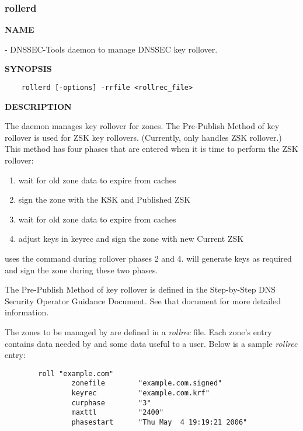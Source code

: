 \clearpage

\subsubsection{\bf rollerd}

{\bf NAME}

 - DNSSEC-Tools daemon to manage DNSSEC key rollover.

{\bf SYNOPSIS}

\begin{verbatim}
    rollerd [-options] -rrfile <rollrec_file>
\end{verbatim}

{\bf DESCRIPTION}

The  daemon manages key rollover for zones.  The Pre-Publish
Method of key rollover is used for ZSK key rollovers.  (Currently,
 only handles ZSK rollover.) This method has four phases that are
entered when it is time to perform the ZSK rollover:

\begin{enumerate}
\item wait for old zone data to expire from caches
\item sign the zone with the KSK and Published ZSK
\item wait for old zone data to expire from caches
\item adjust keys in keyrec and sign the zone with new Current ZSK
\end{enumerate}

 uses the  command during rollover phases 2 and 4.
 will generate keys as required and sign the zone during these
two phases.

The Pre-Publish Method of key rollover is defined in the Step-by-Step DNS
Security Operator Guidance Document.  See that document for more detailed
information.

The zones to be managed by  are defined in a {\it rollrec} file.
Each zone's entry contains data needed by  and some data useful
to a user.  Below is a sample {\it rollrec} entry:

\begin{verbatim}
        roll "example.com"
                zonefile        "example.com.signed"
                keyrec          "example.com.krf"
                curphase        "3"
                maxttl          "2400"
                phasestart      "Thu May  4 19:19:21 2006"
\end{verbatim}

